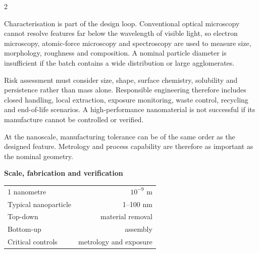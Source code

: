 \begin{multicols}{2}
\begin{ecarticle}
Characterisation is part of the design loop. Conventional optical microscopy cannot resolve features far below the
wavelength of visible light, so electron microscopy, atomic-force microscopy and spectroscopy are used to measure
size, morphology, roughness and composition. A nominal particle diameter is insufficient if the batch contains a
wide distribution or large agglomerates.

Risk assessment must consider size, shape, surface chemistry, solubility and persistence rather than mass alone.
Responsible engineering therefore includes closed handling, local extraction, exposure monitoring, waste control,
recycling and end-of-life scenarios. A high-performance nanomaterial is not successful if its manufacture cannot be
controlled or verified.
\end{ecarticle}

\begin{tcolorbox}[title=\sffamily\bfseries Engineering insight,colback=yellow!10,colframe=ECOrange]
At the nanoscale, manufacturing tolerance can be of the same order as the designed feature. Metrology and process
capability are therefore as important as the nominal geometry.
\end{tcolorbox}

\begin{engineeringfocus}
\textbf{Scale, fabrication and verification}
\begin{center}
\end{center}
\end{engineeringfocus}

\begin{keyfigures}
\begin{tabularx}{\linewidth}{@{}Xr@{}}
1 nanometre & $10^{-9}$ m\\
Typical nanoparticle & 1--100 nm\\
Top-down & material removal\\
Bottom-up & assembly\\
Critical controls & metrology and exposure
\end{tabularx}
\end{keyfigures}


\end{multicols}
